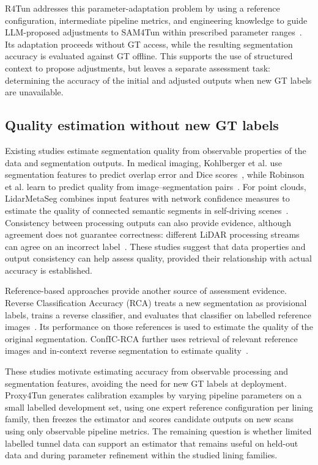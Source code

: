 \documentclass[a4paper,fleqn]{cas-dc}
\begin{document}
R4Tun addresses this parameter-adaptation problem by using a reference configuration, intermediate pipeline metrics, and engineering knowledge to guide LLM-proposed adjustments to SAM4Tun within prescribed parameter ranges~\cite{taoR4Tun}. Its adaptation proceeds without GT access, while the resulting segmentation accuracy is evaluated against GT offline. This supports the use of structured context to propose adjustments, but leaves a separate assessment task: determining the accuracy of the initial and adjusted outputs when new GT labels are unavailable.

\subsection{Quality estimation without new GT labels}

Existing studies estimate segmentation quality from observable properties of the data and segmentation outputs. In medical imaging, Kohlberger et al. use segmentation features to predict overlap error and Dice scores~\cite{kohlberger2012evaluating}, while Robinson et al. learn to predict quality from image--segmentation pairs~\cite{robinson2018segmentationQuality}. For point clouds, LidarMetaSeg combines input features with network confidence measures to estimate the quality of connected semantic segments in self-driving scenes~\cite{colling2021lidarmetaseg}. Consistency between processing outputs can also provide evidence, although agreement does not guarantee correctness: different LiDAR processing streams can agree on an incorrect label~\cite{bogdoll2025labelfree}. These studies suggest that data properties and output consistency can help assess quality, provided their relationship with actual accuracy is established.

Reference-based approaches provide another source of assessment evidence. Reverse Classification Accuracy (RCA) treats a new segmentation as provisional labels, trains a reverse classifier, and evaluates that classifier on labelled reference images~\cite{valindria2017rca}. Its performance on those references is used to estimate the quality of the original segmentation. ConfIC-RCA further uses retrieval of relevant reference images and in-context reverse segmentation to estimate quality~\cite{cosarinsky2026conficrca}.

These studies motivate estimating accuracy from observable processing and segmentation features, avoiding the need for new GT labels at deployment. Proxy4Tun generates calibration examples by varying pipeline parameters on a small labelled development set, using one expert reference configuration per lining family, then freezes the estimator and scores candidate outputs on new scans using only observable pipeline metrics. The remaining question is whether limited labelled tunnel data can support an estimator that remains useful on held-out data and during parameter refinement within the studied lining families.
\end{document}

